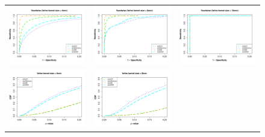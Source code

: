 \documentclass[final,5p,times,twocolumn]{elsarticle}
\begin{document}
\begin{figure}
\begin{center}
\begin{tabular}{ccc}
  \includegraphics[width=57mm]{ISV_SpeSenAlreadyAlignedSmooth0.pdf} &
  \includegraphics[width=57mm]{ISV_SpeSenAlreadyAlignedSmooth1.pdf} &
  \includegraphics[width=57mm]{ISV_SpeSenAlreadyAlignedSmooth2.pdf} \\
  \includegraphics[width=57mm]{ISV_CDFAlreadyAlignedSmooth0.pdf} &
  \includegraphics[width=57mm]{ISV_CDFAlreadyAlignedSmooth1.pdf} &

\end{tabular}
\end{center}
\end{figure}
\end{document}
